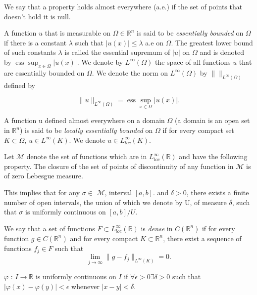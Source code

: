 \documentclass[../main.tex]{subfiles}
\begin{document}
\begin{definition}
	We say that a property holds almost everywhere (a.e.) if the set of points that doesn’t hold it is null.
\end{definition}

\begin{definition}
	A function $u$ that is measurable on  $\Omega \in \mathbb{R}^n$ is said to be \emph{essentially bounded} on $\Omega$ if there is a constant $\lambda$ such that $|u(x)|\leq \lambda$ a.e on $\Omega$.  The greatest lower bound of such constants $\lambda$ is called the essential supremum of $|u|$ on $\Omega$ and is denoted by $\operatorname{ess} \sup_{x\in \Omega} |u(x)|$. We denote by $L^{\infty}(\Omega)$ the space of all functions $u$ that are essentially bounded on $\Omega$. We denote the norm on $L^{\infty}(\Omega)$ by $\| \|_{L^{\infty}(\Omega)}$ defined by

$$	\|u\|_{L^{\infty}(\Omega)} = \operatorname{ess} \sup_{x\in \Omega} |u(x)|.$$

\end{definition}


\begin{definition}
	A function u defined almost everywhere on a domain $\Omega$ (a domain is an open set in $\mathbb{R}^n$) is said to be\emph{ locally essentially bounded }on $\Omega$ if for every compact set $K\subset \Omega$, $u\in L^{\infty}(K)$. We denote $u\in L_{loc}^{\infty}(K)$.
\end{definition}

\begin{definition} Let  $\mathcal{M}$ denote the set of functions which are in $L_{loc}^{\infty}(\mathbb{R})$ and have the following property. The closure of the set of points of discontinuity of any function in $\mathcal{M}$ is of zero Lebesgue measure. 
\end{definition}
\noindent This implies that for any $\sigma \in$ $\mathcal{M}$, interval $[a,b] .$ and $\delta >0$, there exists a finite number of open intervals, the union of which we denote by U, of measure $\delta$, such that $\sigma$ is uniformly continuous on $[a,b]/U$. 


\begin{definition}We say that a set of functions $F\subset L_{loc}^{\infty}(\mathbb{R})$ is \emph{dense} in $C(\mathbb{R}^n)$ if for every function $g\in C(\mathbb{R}^n)$ and for every compact $K\subset \mathbb{R}^n$, there exist a sequence of functions $f_j\in F$ such that $$\lim_{j\rightarrow\infty} \|g-f_j\|_{L^\infty(K)}=0.$$ 
\end{definition}
\begin{definition} 
	$\varphi$ : $I \rightarrow \mathbb{R}$ is uniformly continuous on $I$ if $\forall \epsilon > 0 \exists \delta >0 $ such that $|\varphi(x)- \varphi(y)| < \epsilon$ whenever $|x-y|< \delta.$
\end{definition}
\end{document}
